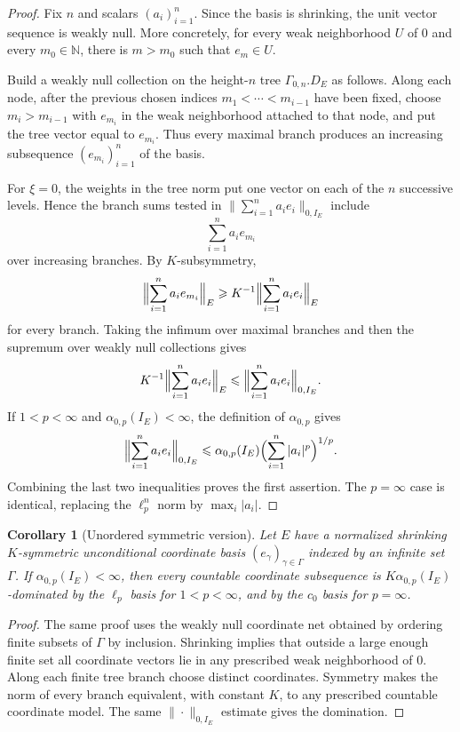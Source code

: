 \documentclass[11pt]{article}
\newtheorem{corollary}{Corollary}
\begin{document}
\begin{proof}
Fix $n$ and scalars $(a_i)_{i=1}^n$.  Since the basis is shrinking, the unit
vector sequence is weakly null.  More concretely, for every weak
neighborhood $U$ of $0$ and every $m_0\in\mathbb{N}$, there is $m>m_0$ such
that $e_m\in U$.

Build a weakly null collection on the height-$n$ tree $\Gamma_{0,n}.D_E$ as
follows.  Along each node, after the previous chosen indices
$m_1<\cdots<m_{i-1}$ have been fixed, choose $m_i>m_{i-1}$ with
$e_{m_i}$ in the weak neighborhood attached to that node, and put the tree
vector equal to $e_{m_i}$.  Thus every maximal branch produces an increasing
subsequence $(e_{m_i})_{i=1}^n$ of the basis.

For $\xi=0$, the weights in the tree norm put one vector on each of the
$n$ successive levels.  Hence the branch sums tested in
$\|\sum_{i=1}^n a_i e_i\|_{0,I_E}$ include
\[
  \sum_{i=1}^n a_i e_{m_i}
\]
over increasing branches.  By $K$-subsymmetry,
\[
  \Bigl\|\sum_{i=1}^n a_i e_{m_i}\Bigr\|_E
  \geqslant K^{-1}
  \Bigl\|\sum_{i=1}^n a_i e_i\Bigr\|_E
\]
for every branch.  Taking the infimum over maximal branches and then the
supremum over weakly null collections gives
\[
  K^{-1}\Bigl\|\sum_{i=1}^n a_i e_i\Bigr\|_E
  \leqslant
  \Bigl\|\sum_{i=1}^n a_i e_i\Bigr\|_{0,I_E}.
\]
If $1<p<\infty$ and $\alpha_{0,p}(I_E)<\infty$, the definition of
$\alpha_{0,p}$ gives
\[
  \Bigl\|\sum_{i=1}^n a_i e_i\Bigr\|_{0,I_E}
  \leqslant \alpha_{0,p}(I_E)
  \Bigl(\sum_{i=1}^n |a_i|^p\Bigr)^{1/p}.
\]
Combining the last two inequalities proves the first assertion.  The
$p=\infty$ case is identical, replacing the $\ell_p^n$ norm by
$\max_i |a_i|$.
\end{proof}

\begin{corollary}[Unordered symmetric version]
Let $E$ have a normalized shrinking $K$-symmetric unconditional coordinate
basis $(e_\gamma)_{\gamma\in\Gamma}$ indexed by an infinite set $\Gamma$.
If $\alpha_{0,p}(I_E)<\infty$, then every countable coordinate subsequence is
$K\alpha_{0,p}(I_E)$-dominated by the $\ell_p$ basis for $1<p<\infty$, and
by the $c_0$ basis for $p=\infty$.
\end{corollary}

\begin{proof}
The same proof uses the weakly null coordinate net obtained by ordering
finite subsets of $\Gamma$ by inclusion.  Shrinking implies that outside a
large enough finite set all coordinate vectors lie in any prescribed weak
neighborhood of $0$.  Along each finite tree branch choose distinct
coordinates.  Symmetry makes the norm of every branch equivalent, with
constant $K$, to any prescribed countable coordinate model.  The same
$\|\cdot\|_{0,I_E}$ estimate gives the domination.
\end{proof}
\end{document}
